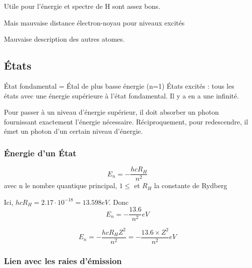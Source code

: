 \documentclass[french]{yLectureNote}
\begin{document}
Utile pour l'énergie et spectre de H sont assez bons.

Mais mauvaise distance électron-noyau pour niveaux excités

Mauvaise description des autres atomes.

\subsection{États}
État fondamental = Étal de plus basse énergie (n=1)
États excités : tous les états avec une énergie supérieure à l'état fondamental. Il y a en a une infinité.


Pour passer à un niveau d'énergie supérieur, il doit absorber un photon fournissant exactement l'énergie nécessaire.  Réciproquement, pour redescendre, il émet un photon d'un certain niveau d'énergie.
\subsubsection{Énergie d'un État}
\begin{theorem}
\[E_n = -\frac{hcR_H}{n^2}\] avec n le nombre quantique principal, $1 \leq$ et $R_H$ la constante de Rydberg
\end{theorem}
Ici, $hcR_H = 2.17\cdot10^{-18} = 13.598eV$. Donc \[E_n = -\frac{13.6}{n^2}eV\]
\begin{theorem}
\[E_n = -\frac{hcR_HZ^2}{n^2} = -\frac{13.6\times Z^2}{n^2}eV\]
\end{theorem}
\subsubsection{Lien avec les raies d'émission}
\end{document}
